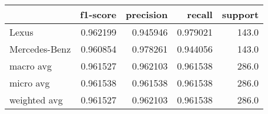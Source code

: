 \begin{tabular}{lrrrr}
\toprule
{} &  f1-score &  precision &    recall &  support \\
\midrule
Lexus         &  0.962199 &   0.945946 &  0.979021 &    143.0 \\
Mercedes-Benz &  0.960854 &   0.978261 &  0.944056 &    143.0 \\
macro avg     &  0.961527 &   0.962103 &  0.961538 &    286.0 \\
micro avg     &  0.961538 &   0.961538 &  0.961538 &    286.0 \\
weighted avg  &  0.961527 &   0.962103 &  0.961538 &    286.0 \\
\bottomrule
\end{tabular}
